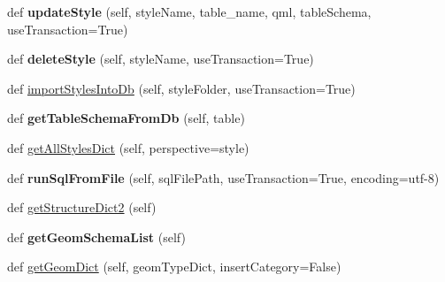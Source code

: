 \begin{DoxyCompactItemize}
def {\bfseries update\+Style} (self, style\+Name, table\+\_\+name, qml, table\+Schema, use\+Transaction=True)
\item 
\mbox{\label{class_dsg_tools_1_1_factories_1_1_db_factory_1_1postgis_db_1_1_postgis_db_a4e983d9bf6388136403a4a144f8788f1}} 
def {\bfseries delete\+Style} (self, style\+Name, use\+Transaction=True)
\item 
def \mbox{\hyperlink{class_dsg_tools_1_1_factories_1_1_db_factory_1_1postgis_db_1_1_postgis_db_ac42464167014927751a4ad7133f34197}{import\+Styles\+Into\+Db}} (self, style\+Folder, use\+Transaction=True)
\item 
\mbox{\label{class_dsg_tools_1_1_factories_1_1_db_factory_1_1postgis_db_1_1_postgis_db_a0e4a4fed7d83ffe47d69adcb41c0024f}} 
def {\bfseries get\+Table\+Schema\+From\+Db} (self, table)
\item 
def \mbox{\hyperlink{class_dsg_tools_1_1_factories_1_1_db_factory_1_1postgis_db_1_1_postgis_db_af255f96d50c2346b5d6dcef8f842e51d}{get\+All\+Styles\+Dict}} (self, perspective=\textquotesingle{}style\textquotesingle{})
\item 
\mbox{\label{class_dsg_tools_1_1_factories_1_1_db_factory_1_1postgis_db_1_1_postgis_db_a2f5f84a35de7285b74e9b284f1ae8129}} 
def {\bfseries run\+Sql\+From\+File} (self, sql\+File\+Path, use\+Transaction=True, encoding=\textquotesingle{}utf-\/8\textquotesingle{})
\item 
def \mbox{\hyperlink{class_dsg_tools_1_1_factories_1_1_db_factory_1_1postgis_db_1_1_postgis_db_a9539edb8eb6713fa788cb4d7c931778c}{get\+Structure\+Dict2}} (self)
\item 
\mbox{\label{class_dsg_tools_1_1_factories_1_1_db_factory_1_1postgis_db_1_1_postgis_db_ae8607ca7a448481d86e7b56c4ebdd3df}} 
def {\bfseries get\+Geom\+Schema\+List} (self)
\item 
def \mbox{\hyperlink{class_dsg_tools_1_1_factories_1_1_db_factory_1_1postgis_db_1_1_postgis_db_a9a3bd96db6a15182a4a52888b3384eac}{get\+Geom\+Dict}} (self, geom\+Type\+Dict, insert\+Category=False)
\item 

\end{DoxyCompactItemize}
